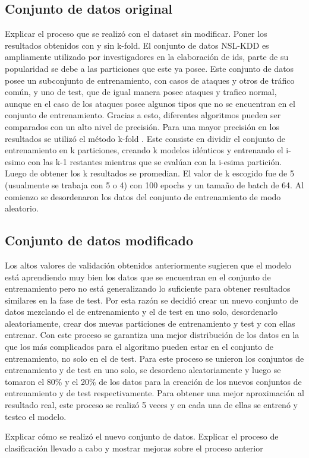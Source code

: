 \subsection{Conjunto de datos original}
Explicar el proceso que se realizó con el dataset sin modificar. Poner los resultados obtenidos con y sin k-fold.
El conjunto de datos NSL-KDD es ampliamente utilizado por investigadores en la elaboración de ids, parte de su popularidad se debe a las particiones que este ya posee. Este conjunto de datos posee un subconjunto de entrenamiento, con casos de ataques y otros de tráfico común, y uno de test, que de igual manera posee ataques y trafico normal, aunque en el caso de los ataques posee algunos tipos que no se encuentran en el conjunto de entrenamiento. Gracias a esto, diferentes algoritmos pueden ser comparados con un alto nivel de precisión.
Para una mayor precisión en los resultados se utilizó el método k-fold \cite{10.5555/3203489}. Este consiste en dividir el conjunto de entrenamiento en k particiones, creando k modelos idénticos y entrenando el i-esimo con las k-1 restantes mientras que se evalúan con la i-esima partición. Luego de obtener los k resultados se promedian. El valor de k escogido fue de 5 (usualmente se trabaja con 5 o 4) con 100 epochs y un tamaño de batch de 64. Al comienzo se desordenaron los datos del conjunto de entrenamiento de modo aleatorio.

\subsection{Conjunto de datos modificado}
Los altos valores de validación obtenidos anteriormente sugieren que el modelo está aprendiendo muy bien los datos que se encuentran en el conjunto de entrenamiento pero no está generalizando lo suficiente para obtener resultados similares en la fase de test. Por esta razón se decidió crear un nuevo conjunto de datos mezclando el de entrenamiento y el de test en uno solo, desordenarlo aleatoriamente, crear dos nuevas particiones de entrenamiento y test y con ellas entrenar. Con este proceso se garantiza una mejor distribución de los datos en la que los más complicados para el algoritmo pueden estar en el conjunto de entrenamiento, no solo en el de test.
Para este proceso se unieron los conjuntos de entrenamiento y de test en uno solo, se desordeno aleatoriamente y luego se tomaron el 80\% y el 20\% de los datos para la creación de los nuevos conjuntos de entrenamiento y de test respectivamente. Para obtener una mejor aproximación al resultado real, este proceso se realizó 5 veces y en cada una de ellas se entrenó y testeo el modelo.

Explicar cómo se realizó el nuevo conjunto de datos. Explicar el proceso de clasificación llevado a cabo y mostrar mejoras sobre el proceso anterior